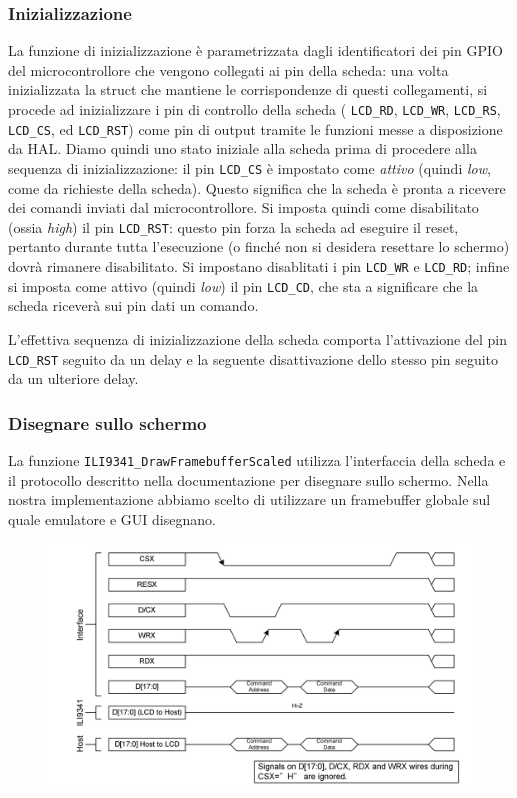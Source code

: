 \documentclass[hidelinks,12pt]{article}
\begin{document}
\subsubsection{Inizializzazione}
La funzione di inizializzazione è parametrizzata dagli identificatori dei pin
GPIO del microcontrollore che vengono collegati ai pin della scheda: una volta
inizializzata la struct che mantiene le corrispondenze di questi collegamenti,
si procede ad inizializzare i pin di controllo della scheda ( \texttt{LCD\_RD},
\texttt{LCD\_WR}, \texttt{LCD\_RS}, \texttt{LCD\_CS}, ed \texttt{LCD\_RST}) come
pin di output tramite le funzioni messe a disposizione da HAL. Diamo quindi uno
stato iniziale alla scheda prima di procedere alla sequenza di inizializzazione:
il pin \texttt{LCD\_CS} è impostato come \textit{attivo} (quindi \textit{low},
come da richieste della scheda). Questo significa che la scheda è pronta a
ricevere dei comandi inviati dal microcontrollore. Si imposta quindi come
disabilitato (ossia \textit{high}) il pin \texttt{LCD\_RST}: questo pin forza la
scheda ad eseguire il reset, pertanto durante tutta l'esecuzione (o finché non
si desidera resettare lo schermo) dovrà rimanere disabilitato.
Si impostano disablitati i pin \texttt{LCD\_WR} e \texttt{LCD\_RD}; infine si
imposta come attivo (quindi \textit{low}) il pin \texttt{LCD\_CD}, che sta a
significare che la scheda riceverà sui pin dati un comando.

L'effettiva sequenza di inizializzazione della scheda comporta l'attivazione del
pin \texttt{LCD\_RST} seguito da un delay  e la seguente disattivazione dello
stesso pin seguito da un ulteriore delay.

\subsubsection{Disegnare sullo schermo}
La funzione \texttt{ILI9341\_DrawFramebufferScaled} utilizza l'interfaccia della
scheda e il protocollo descritto nella documentazione per disegnare sullo
schermo. Nella nostra implementazione abbiamo scelto di utilizzare un framebuffer
globale sul quale emulatore e GUI disegnano.

\begin{figure}[h]
	\centering
	\includegraphics[scale=0.8]{figures/wr_cycle.png}
	\caption{}
	\label{fig:ili_wr_cycle}
\end{figure}
\end{document}

